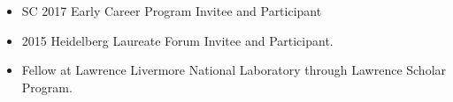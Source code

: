 \begin{itemize} 
\item SC 2017 Early Career Program Invitee and Participant
\item 2015 Heidelberg Laureate Forum Invitee and Participant.
\item Fellow at Lawrence Livermore National Laboratory through Lawrence Scholar Program.
\end{itemize}
